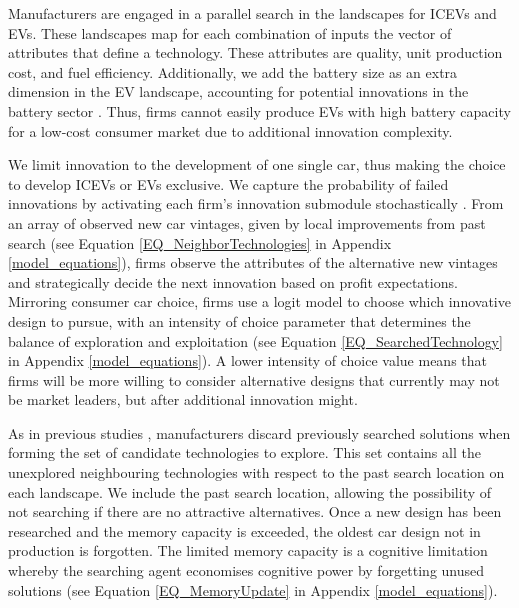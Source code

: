 \documentclass[12pt]{article}
\begin{document}
	Manufacturers are engaged in a parallel search in the landscapes for ICEVs and EVs. These landscapes map for each combination of inputs the vector of attributes that define a technology. These attributes are quality, unit production cost, and fuel efficiency. Additionally, we add the battery size as an extra dimension in the EV landscape, accounting for potential innovations in the battery sector \citep{yao2025critically}. Thus, firms cannot easily produce EVs with high battery capacity for a low-cost consumer market due to additional innovation complexity.

    We limit innovation to the development of one single car, thus making the choice to develop ICEVs or EVs exclusive. We capture the probability of failed innovations by activating each firm's innovation submodule stochastically \citep{nelson1977search}. From an array of observed new car vintages, given by local improvements from past search (see Equation \ref{EQ_NeighborTechnologies} in Appendix \ref{model_equations}), firms observe the attributes of the alternative new vintages and strategically decide the next innovation based on profit expectations. Mirroring consumer car choice, firms use a logit model to choose which innovative design to pursue, with an intensity of choice parameter that determines the balance of exploration and exploitation \citep{Puranam2015} (see Equation \ref{EQ_SearchedTechnology} in Appendix \ref{model_equations}). A lower intensity of choice value means that firms will be more willing to consider alternative designs that currently may not be market leaders, but after additional innovation might.

	As in previous studies \citep{jain2014memory,bassart2026mixing}, manufacturers discard previously searched solutions when forming the set of candidate technologies to explore. This set contains all the unexplored neighbouring technologies with respect to the past search location on each landscape. We include the past search location, allowing the possibility of not searching if there are no attractive alternatives. Once a new design has been researched and the memory capacity is exceeded, the oldest car design not in production is forgotten. The limited memory capacity is a cognitive limitation whereby the searching agent economises cognitive power by forgetting unused solutions (see Equation \ref{EQ_MemoryUpdate} in Appendix \ref{model_equations}).  %
\end{document}

